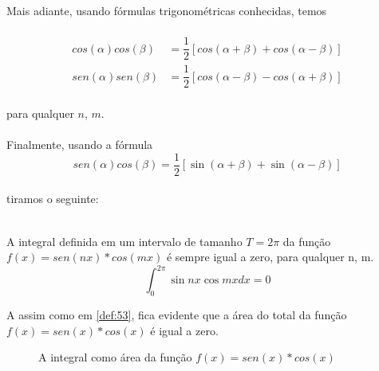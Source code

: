  
Mais adiante, usando fórmulas trigonométricas conhecidas, temos\\
\\
\begin{equation}
\label{eq:54}
    \begin{split}
        cos(\alpha)cos(\beta) & = \dfrac{1}{2}[cos(\alpha + \beta) + cos(\alpha - \beta)]\\
        sen(\alpha)sen(\beta) & = \dfrac{1}{2}[cos(\alpha - \beta) - cos(\alpha + \beta)]
    \end{split}
\end{equation}
\\
para qualquer $n$, $m$.\\
\\
Finalmente, usando a fórmula \\
\begin{equation}
        sen(\alpha)cos(\beta) = \dfrac{1}{2}[\sin{(\alpha + \beta)} + \sin{(\alpha - \beta)}]    
\end{equation}
\\
tiramos o seguinte:\\
\\
\begin{definicao}
    A integral definida em um intervalo de tamanho $T=2\pi$ da função $f(x)=sen(nx)*cos(mx)$
    é sempre igual a zero, para qualquer n, m.
    \begin{equation}
        \int_{0}^{2\pi}\sin{nx}\cos{mx}dx = 0
    \end{equation}
    \label{def:55}
\end{definicao}

A assim como em \ref{def:53}, fica evidente que a área do total da função 
$f(x)=sen(x)*cos(x)$ é igual a zero.
\begin{figure}[H]
\caption{A integral como área da função $f(x)=sen(x)*cos(x)$}
\label{fig:intSenCos}
\end{figure}

